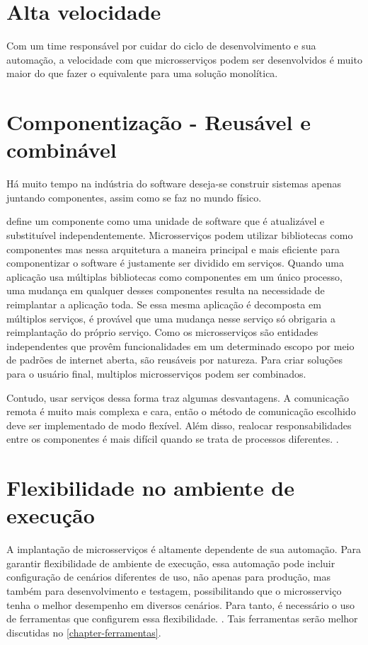 \section{Alta velocidade}

Com um time responsável por cuidar do ciclo de desenvolvimento e sua automação, a velocidade com que microsserviços podem ser desenvolvidos é muito maior do que fazer o equivalente para uma solução monolítica. \cite{Familiar2015}

\section{Componentização - Reusável e combinável}

Há muito tempo na indústria do software deseja-se construir sistemas apenas juntando componentes, assim como se faz no mundo físico.

 define um componente como uma unidade de software que é atualizável e substituível independentemente. Microsserviços podem utilizar bibliotecas como componentes mas nessa arquitetura a maneira principal e mais eficiente para componentizar o software é justamente ser dividido em serviços. Quando uma aplicação usa múltiplas bibliotecas como componentes em um único processo, uma mudança em qualquer desses componentes resulta na necessidade de reimplantar a aplicação toda. Se essa mesma aplicação é decomposta em múltiplos serviços, é provável que uma mudança nesse serviço só obrigaria a reimplantação do próprio serviço. Como os microsserviços são entidades independentes que provêm funcionalidades em um determinado escopo por meio de padrões de internet aberta, são reusáveis por natureza. Para criar soluções para o usuário final, multiplos microsserviços podem ser combinados. \cite{MartinFowlerMicroservices,Familiar2015}

Contudo, usar serviços dessa forma traz algumas desvantagens. A comunicação remota é muito mais complexa e cara, então o método de comunicação escolhido deve ser implementado de modo flexível. Além disso, realocar responsabilidades entre os componentes é mais difícil quando se trata de processos diferentes. \cite{MartinFowlerMicroservices}.

\section{Flexibilidade no ambiente de execução}

A implantação de microsserviços é altamente dependente de sua automação. Para garantir flexibilidade de ambiente de execução, essa automação pode incluir configuração de cenários diferentes de uso, não apenas para produção, mas também para desenvolvimento e testagem, possibilitando que o microsserviço tenha o melhor desempenho em diversos cenários. Para tanto, é necessário o uso de ferramentas que configurem essa flexibilidade. \cite{Familiar2015}. Tais ferramentas serão melhor discutidas no \autoref{chapter-ferramentas}.

